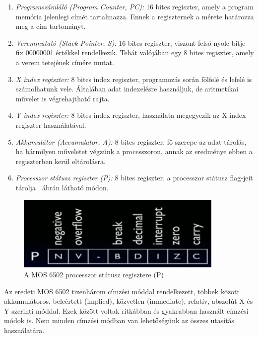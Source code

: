 	\begin{enumerate}
		\item \emph{Programszámláló (Program Counter, PC):} 16 bites regiszter, amely a program memória jelenlegi címét tartalmazza. Ennek a regiszternek a mérete határozza meg a cím tartományt.
		\item \emph{Veremmutató (Stack Pointer, S):} 16 bites regiszter, viszont felső nyolc bitje fix 00000001 értékkel rendelkezik. Tehát valójában egy 8 bites regiszter, amely a verem tetejének címére mutat. 
		\item \emph{X index regiszter:} 8 bites index regiszter, programozás során fölfelé és lefelé is számolhatunk vele. Általában adat indexelésre használjuk, de aritmetikai művelet is végrehajtható rajta.
		\item\emph{Y index regiszter:} 8 bites index regiszter, használata megegyezik az X index regiszter használatával. 
		\item \emph{Akkumulátor (Accumulator, A):} 8 bites regiszter, fő szerepe az adat tárolás, ha bármilyen műveletet végzünk a processzoron, annak az eredménye ebben a regiszterben kerül eltárolásra.
		\item \emph{Processzor státusz regiszter (P):} 8 bites regiszter, a processzor státusz flag-jeit tárolja . ábrán látható módon.	
	\end{enumerate} 
	
	\begin{figure}[H]
		\centering
		\includegraphics[width=100mm, keepaspectratio]{figures/6502-P-reg}
		\caption{A MOS 6502 processzor státusz regisztere (P) \cite{6502_reverse_eng}}
		\label{fig:6502-P-reg}
	\end{figure} 
	
	Az eredeti MOS 6502 tizenhárom címzési móddal rendelkezett, többek között akkumulátoros, beleértett (implied), közvetlen (immediate), relatív, abszolút X és Y szerinti móddal. Ezek között voltak ritkábban és gyakrabban használt címzési módok is. Nem minden címzési módban van lehetőségünk az összes utasítás használatára.
	
